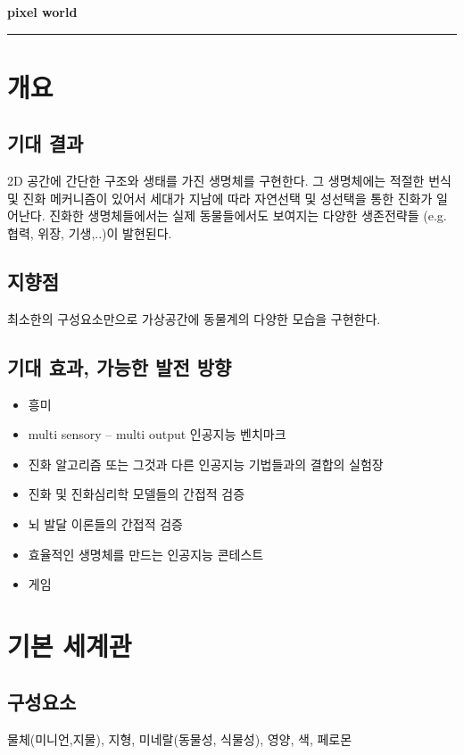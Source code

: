 \documentclass[a4paper,12pt]{article}
\begin{document}
\begin{center}\LARGE
	\textbf{pixel world}
\end{center}
\vspace{0.5cm}
\hrule
\vspace{0.5cm}
\section{개요}
\subsection{기대 결과}\label{expected outcome}
2D 공간에 간단한 구조와 생태를 가진 생명체를 구현한다. 그 생명체에는 적절한 번식 및 진화 메커니즘이 있어서 세대가 지남에 따라 자연선택 및 성선택을 통한 진화가 일어난다. 진화한 생명체들에서는 실제 동물들에서도 보여지는 다양한 생존전략들 (e.g. 협력, 위장, 기생,..)이 발현된다. 
\subsection{지향점}\label{design philosophy} 
최소한의 구성요소만으로 가상공간에 동물계의 다양한 모습을 구현한다.
\subsection{기대 효과, 가능한 발전 방향}\label{future development}
\begin{itemize}
\item 흥미
\item multi sensory – multi output 인공지능 벤치마크 
\item 진화 알고리즘 또는 그것과 다른 인공지능 기법들과의 결합의 실험장 
\item 진화 및 진화심리학 모델들의 간접적 검증
\item 뇌 발달 이론들의 간접적 검증 
\item 효율적인 생명체를 만드는 인공지능 콘테스트  
\item 게임
\end{itemize}

\section{기본 세계관}
\subsection{구성요소}\label{world components}
물체(미니언,지물), 지형, 미네랄(동물성, 식물성), 영양, 색, 페로몬 
\end{document}
